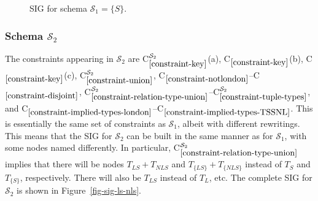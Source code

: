 \documentclass{sig-alternate-05-2015}
\newcounter{constraint}
\newcommand{\LS}{\ensuremath{\mathit{LS}}}
\newcommand{\NLS}{\ensuremath{\mathit{NLS}}}
\newcommand{\LSsub}{\ensuremath{\mathit{L}}}
\newcommand{\T}[1]{\ensuremath{T_{#1}}}
\newcommand{\TT}[1]{\ensuremath{T_{\{#1\}}}}
\newcommand{\TLSPlusNLS}{\ensuremath{\T{\LS} + \T{\NLS}}}
\newcommand{\TTLSPlusNLS}{\ensuremath{\TT{\LS} + \TT{\NLS}}}
\newcommand{\SC}[1]{\ensuremath{\mathcal{S}_{#1}}}
\newcommand{\Constraint}[2][]{C\ensuremath{_{#2}\ifx&#1&\else^{#1}\fi}}
\begin{document}
\begin{figure*}
    \caption{SIG for schema \(\SC{1} = \{S\}\).}
    \label{fig-sig-s}
\end{figure*}





\subsubsection{Schema \(\SC{2}\)}
\label{sec-sigs-s-ii}

\noindent The constraints appearing in \(\SC{2}\) are \Constraint[\SC{2}]{\ref{constraint-key}}(a), \Constraint{\ref{constraint-key}}(b), \Constraint{\ref{constraint-key}}(c), \Constraint[\SC{2}]{\ref{constraint-union}}, \Constraint{\ref{constraint-notlondon}}--\Constraint{\ref{constraint-disjoint}}, \Constraint[\SC{2}]{\ref{constraint-relation-type-union}}--\Constraint[\SC{2}]{\ref{constraint-tuple-types}}, and \Constraint{\ref{constraint-implied-types-london}}--\Constraint{\ref{constraint-implied-types-TSSNL}}. This is essentially the same set of constraints as \(\SC{1}\), albeit with different rewritings. This means that the SIG for \(\SC{2}\) can be built in the same manner as for \(\SC{1}\), with some nodes named differently. In particular, \Constraint[\SC{2}]{\ref{constraint-relation-type-union}} implies that there will be nodes \(\TLSPlusNLS\) and \(\TTLSPlusNLS\) instead of \(\T{S}\) and \(\TT{S}\), respectively. There will also be \(\T{\LS}\) instead of \(\T{\LSsub}\), etc. The complete SIG for \(\SC{2}\) is shown in Figure~\ref{fig-sig-ls-nls}.
\end{document}
